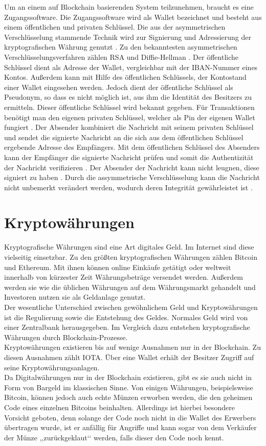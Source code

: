 Um an einem auf Blockchain basierenden System teilzunehmen, braucht es eine Zugangssoftware. Die Zugangssoftware wird als Wallet bezeichnet und besteht aus einem öffentlichen und privaten Schlüssel. Die aus der asymmetrischen Verschlüsselung stammende Technik wird zur Signierung und Adressierung der kryptografischen Währung genutzt \citep{stallings}. Zu den bekanntesten asymmetrischen Verschlüsselungsverfahren zählen RSA und Diffie-Hellman \citep{RSADH}.
Der öffentliche Schlüssel dient als Adresse der Wallet, vergleichbar mit der IBAN-Nummer eines Kontos. Außerdem kann mit Hilfe des öffentlichen Schlüssels, der Kontostand einer Wallet eingesehen werden. Jedoch dient der öffentliche Schlüssel als Pseudonym, so dass es nicht möglich ist, aus ihm die Identität des Besitzers zu ermitteln. Dieser öffentliche Schlüssel wird bekannt gegeben. Für Transaktionen benötigt man den eigenen privaten Schlüssel, welcher als Pin der eigenen Wallet fungiert \citep{priv}. Der Absender kombiniert die Nachricht mit seinem privaten Schlüssel und sendet die signierte Nachricht an die sich aus dem öffentlichen Schlüssel ergebende Adresse des Empfängers. Mit dem öffentlichen Schlüssel des Absenders kann der Empfänger die signierte Nachricht prüfen und somit die Authentizität der Nachricht verifizieren \citep{badev}. Der Absender der Nachricht kann nicht leugnen, diese signiert zu haben \citep{franco}. Durch die assymmetrische Verschlüsselung kann die Nachricht nicht unbemerkt verändert werden, wodurch deren Integrität gewährleistet ist \citep{stallings}.
	
	\section{Kryptowährungen}
Kryptografische Währungen sind eine Art digitales Geld. Im Internet sind diese vielseitig einsetzbar. Zu den größten kryptografischen Währungen zählen Bitcoin und Ethereum. Mit ihnen können online Einkäufe getätigt oder weltweit innerhalb von kürzester Zeit Währungsbeträge versendet werden. Außerdem werden sie wie die üblichen Währungen auf dem Währungsmarkt gehandelt und Investoren nutzen sie als Geldanlage genutzt.\\
Der wesentliche Unterschied zwischen gewöhnlichem Geld und Kryptowährungen ist die Regulierung sowie die Entstehung des Geldes. Normales Geld wird von einer Zentralbank herausgegeben. Im Vergleich dazu entstehen kryptografische Währungen durch Blockchain-Prozesse. \\
Kryptowährungen existieren bis auf wenige Ausnahmen nur in der Blockchain. Zu diesen Ausnahmen zählt IOTA. Über eine Wallet erhält der Besitzer Zugriff auf seine Kryptowährungsanlagen.\\
Da Digitalwährungen nur in der Blockchain existieren, gibt es sie auch nicht in Form von Bargeld im klassischen Sinne. Von einigen Währungen, beispielsweise Bitcoin, können jedoch auch echte Münzen erworben werden, die den geheimen Code eines einzelnen Bitcoins beinhalten. Allerdings ist hierbei besondere Vorsicht geboten, denn solange der Code noch nicht in die Wallet des Erwerbers übertragen wurde, ist er anfällig für Angriffe und kann sogar von dem Verkäufer der Münze ,,zurückgeklaut‘‘ werden, falls dieser den Code noch kennt. \citep{kcur}	
		

